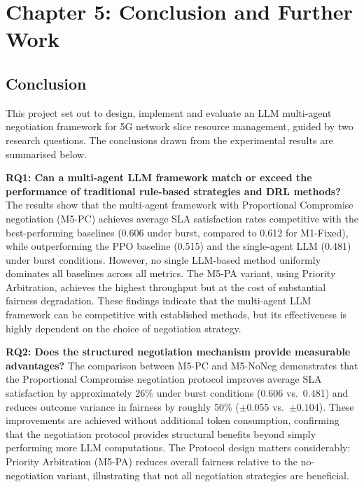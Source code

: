 \section*{Chapter 5: Conclusion and Further Work}
 \setcounter{section}{5} \setcounter{subsection}{0}

\subsection{Conclusion}

This project set out to design, implement and evaluate an LLM multi-agent negotiation framework for 5G network slice resource management, guided by two research questions. The conclusions drawn from the experimental results are summarised below.

\textbf{RQ1: Can a multi-agent LLM framework match or exceed the performance of traditional rule-based strategies and DRL methods?} The results show that the multi-agent framework with Proportional Compromise negotiation (M5-PC) achieves average SLA satisfaction rates competitive with the best-performing baselines (0.606 under burst, compared to 0.612 for M1-Fixed), while outperforming the PPO baseline (0.515) and the single-agent LLM (0.481) under burst conditions. However, no single LLM-based method uniformly dominates all baselines across all metrics. The M5-PA variant, using Priority Arbitration, achieves the highest throughput but at the cost of substantial fairness degradation. These findings indicate that the multi-agent LLM framework can be competitive with established methods, but its effectiveness is highly dependent on the choice of negotiation strategy.

\textbf{RQ2: Does the structured negotiation mechanism provide measurable advantages?} The comparison between M5-PC and M5-NoNeg demonstrates that the Proportional Compromise negotiation protocol improves average SLA satisfaction by approximately 26\% under burst conditions (0.606 vs.\ 0.481) and reduces outcome variance in fairness by roughly 50\% ($\pm 0.055$ vs.\ $\pm 0.104$). These improvements are achieved without additional token consumption, confirming that the negotiation protocol provides structural benefits beyond simply performing more LLM computations. The Protocol design matters considerably: Priority Arbitration (M5-PA) reduces overall fairness relative to the no-negotiation variant, illustrating that not all negotiation strategies are beneficial.

